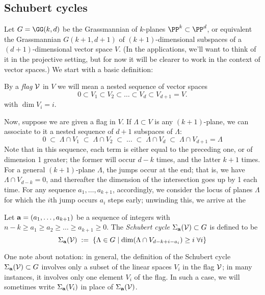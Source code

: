 \subsection{Schubert cycles}

Let $G = \GG(k, d)$ be the Grassmannian of $k$-planes $\PP^k \subset \PP^d$, or equivalent the Grassmannian $G(k+1,d+1)$ of $(k+1)$-dimensional subspaces of a $(d+1)$-dimensional vector space $V$.
(In the applications, we'll want to think of it in the projective setting, but for now it will be clearer to work in the context  of vector spaces.) We start with a basic definition:

\begin{definition}
By a \emph{flag} $\cal V$  in $V$ we will mean a nested sequence of vector spaces
$$
0 \subset V_1 \subset V_2 \subset \dots \subset V_d \subset V_{d+1} = V.
$$
with $\dim V_i = i$.
\end{definition}

Now, suppose we are given a flag in $V$. If $\Lambda \subset V$ is any $(k+1)$-plane, we can associate to it a nested sequence of $d+1$ subspaces of $\Lambda$:
$$
0 \; \subset \; \Lambda \cap V_1 \; \subset \;  \Lambda \cap V_2 \; \subset \;  \dots \; \subset \;  \Lambda \cap V_d \; \subset \;  \Lambda \cap V_{d+1} = \Lambda
$$
Note that in this sequence, each term is either equal to the preceding one, or of dimension 1 greater; the former will occur $d-k$ times, and the latter $k+1$ times. For a general $(k+1)$-plane $\Lambda$, the jumps occur at the end; that is, we have $\Lambda \cap V_{d-k} = 0$, and thereafter the dimension of the intersection goes up by 1 each time. For any sequence $a_1,\dots, a_{k+1}$, accordingly, we consider the locus of planes $\Lambda$ for which the $i$th jump occurs $a_i$ steps early; unwinding this, we arrive at the

\begin{definition}
Let ${\bf a} = (a_1,\dots,a_{k+1})$ be a sequence of integers with $n-k \geq a_1 \geq a_2 \geq \dots \geq a_{k+1} \geq 0$.
The \emph{Schubert cycle $\Sigma_{\bf a}({\cal V}) \subset G$} is defined to be
$$
\Sigma_{\bf a}({\cal V}) \; := \; \left\{ \Lambda \in G \mid \dim(\Lambda \cap V_{d-k+i-a_i}) \geq i \; \forall i \right\}
$$
\end{definition}

One note about notation: in general, the definition of the Schubert cycle $\Sigma_{\bf a}({\cal V}) \subset G$ involves only a subset of the linear spaces $V_i$ in the flag $\cal V$; in many instances, it involves only one element $V_i$ of the flag. In such a case, we will sometimes write $\Sigma_{\bf a}(V_i)$ in place of $\Sigma_{\bf a}({\cal V})$.

